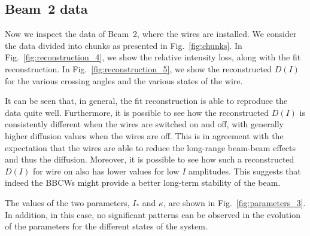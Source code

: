 \subsection*{Beam~2 data}

Now we inspect the data of Beam~2, where the wires are installed. We consider the data divided into chunks as presented in Fig.~\ref{fig:chunks}. In Fig.~\ref{fig:reconstruction_4}, we show the relative intensity loss, along with the fit reconstruction. In Fig.~\ref{fig:reconstruction_5}, we show the reconstructed $D(I)$ for the various crossing angles and the various states of the wire.

It can be seen that, in general, the fit reconstruction is able to reproduce the data quite well. Furthermore, it is possible to see how the reconstructed $D(I)$ is consistently different when the wires are switched on and off, with generally higher diffusion values when the wires are off. This is in agreement with the expectation that the wires are able to reduce the long-range beam-beam effects and thus the diffusion. Moreover, it is possible to see how such a reconstructed $D(I)$ for wire on  also has lower values for low $I$ amplitudes. This suggests that indeed the BBCWs might provide a better long-term stability of the beam.

The values of the two parameters, $I_\ast$ and $\kappa$, are shown in Fig.~\ref{fig:parameters_3}. In addition, in this case, no significant patterns can be observed in the evolution of the parameters for the different states of the system.


